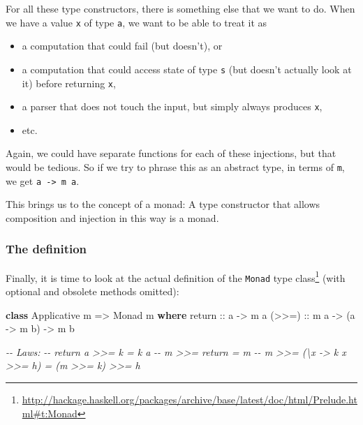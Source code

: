 \documentclass[11pt,
  american,
  DIV13]{article}
\newenvironment{Shaded}{}{}
\newcommand{\CommentTok}[1]{\textcolor[rgb]{0.38,0.63,0.69}{\textit{#1}}}
\newcommand{\DataTypeTok}[1]{\textcolor[rgb]{0.56,0.13,0.00}{#1}}
\newcommand{\KeywordTok}[1]{\textcolor[rgb]{0.00,0.44,0.13}{\textbf{#1}}}
\newcommand{\NormalTok}[1]{#1}
\newcommand{\OtherTok}[1]{\textcolor[rgb]{0.00,0.44,0.13}{#1}}
\DeclareRobustCommand{\href}[2]{#2\footnote{\url{#1}}}
\providecommand{\tightlist}{%
  \setlength{\itemsep}{0pt}\setlength{\parskip}{0pt}}
\begin{document}
For all these type constructors, there is something else that we want to
do. When we have a value \texttt{x} of type \texttt{a}, we want to be
able to treat it as

\begin{itemize}
\tightlist
\item
  a computation that could fail (but doesn't), or
\item
  a computation that could access state of type \texttt{s} (but doesn't
  actually look at it) before returning \texttt{x},
\item
  a parser that does not touch the input, but simply always produces
  \texttt{x},
\item
  etc.
\end{itemize}

Again, we could have separate functions for each of these injections,
but that would be tedious. So if we try to phrase this as an abstract
type, in terms of \texttt{m}, we get \texttt{a\ -\textgreater{}\ m\ a}.

This brings us to the concept of a monad: A type constructor that allows
composition and injection in this way is a monad.

\hypertarget{the-definition}{%
\subsubsection{The definition}\label{the-definition}}

Finally, it is time to look at the actual
\href{http://hackage.haskell.org/packages/archive/base/latest/doc/html/Prelude.html\#t:Monad}{definition
of the \texttt{Monad} type class} (with optional and obsolete methods
omitted):

\begin{Shaded}
\begin{Highlighting}[]
\KeywordTok{class} \DataTypeTok{Applicative}\NormalTok{ m }\OtherTok{=\textgreater{}} \DataTypeTok{Monad}\NormalTok{ m }\KeywordTok{where}
\OtherTok{    return ::}\NormalTok{ a }\OtherTok{{-}\textgreater{}}\NormalTok{ m a}
\OtherTok{    (\textgreater{}\textgreater{}=)  ::}\NormalTok{ m a }\OtherTok{{-}\textgreater{}}\NormalTok{ (a }\OtherTok{{-}\textgreater{}}\NormalTok{ m b) }\OtherTok{{-}\textgreater{}}\NormalTok{ m b}

\CommentTok{{-}{-} Laws:}
\CommentTok{{-}{-} return a \textgreater{}\textgreater{}= k = k a}
\CommentTok{{-}{-} m \textgreater{}\textgreater{}= return = m}
\CommentTok{{-}{-} m \textgreater{}\textgreater{}= (\textbackslash{}x {-}\textgreater{} k x \textgreater{}\textgreater{}= h) = (m \textgreater{}\textgreater{}= k) \textgreater{}\textgreater{}= h}
\end{Highlighting}
\end{Shaded}
\end{document}
